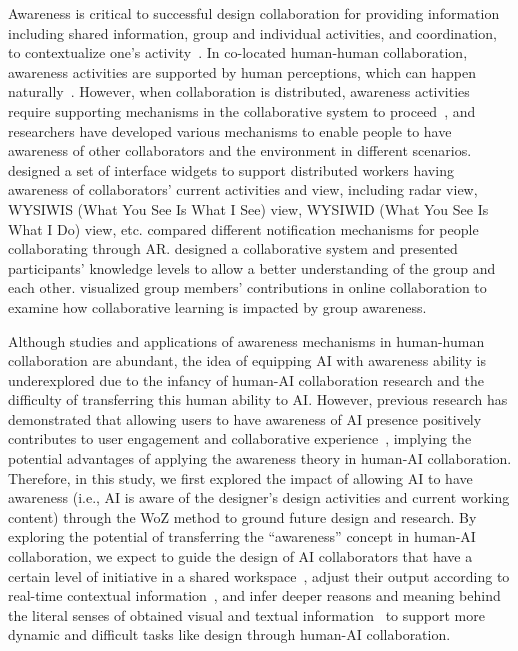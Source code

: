 Awareness is critical to successful design collaboration for providing information including shared information, group and individual activities, and coordination, to contextualize one's activity~\cite{Dourish1992awareness}. In co-located human-human collaboration, awareness activities are supported by human perceptions, which can happen naturally~\cite{Gutwin2002descriptive}. However, when collaboration is distributed, awareness activities require supporting mechanisms in the collaborative system to proceed~\cite{Gutwin2002descriptive}, and researchers have developed various mechanisms to enable people to have awareness of other collaborators and the environment in different scenarios. \citet{Gutwin1996Widgets} designed a set of interface widgets to support distributed workers having awareness of collaborators' current activities and view, including radar view, WYSIWIS (What You See Is What I See) view, WYSIWID (What You See Is What I Do) view, etc. \citet{Cidota2016HMD} compared different notification mechanisms for people collaborating through AR. \citet{Dehler2011guiding} designed a collaborative system and presented participants' knowledge levels to allow a better understanding of the group and each other. \citet{Janssen2011Group} visualized group members' contributions in online collaboration to examine how collaborative learning is impacted by group awareness.

Although studies and applications of awareness mechanisms in human-human collaboration are abundant, the idea of equipping AI with awareness ability is underexplored due to the infancy of human-AI collaboration research and the difficulty of transferring this human ability to AI. However, previous research has demonstrated that allowing users to have awareness of AI presence positively contributes to user engagement and collaborative experience~\cite{Rezwana2021penpal}, implying the potential advantages of applying the awareness theory in human-AI collaboration. Therefore, in this study, we first explored the impact of allowing AI to have awareness (i.e., AI is aware of the designer's design activities and current working content) through the WoZ method to ground future design and research. By exploring the potential of transferring the ``awareness'' concept in human-AI collaboration, we expect to guide the design of AI collaborators that have a certain level of initiative in a shared workspace~\cite{Salikutluk2024situational, He2024Canvas}, adjust their output according to real-time contextual information~\cite{Ma2023ProactiveAgent}, and infer deeper reasons and meaning behind the literal senses of obtained visual and textual information~\cite{Liu2024ComPeer, Liang2019Implicit} to support more dynamic and difficult tasks like design through human-AI collaboration.

